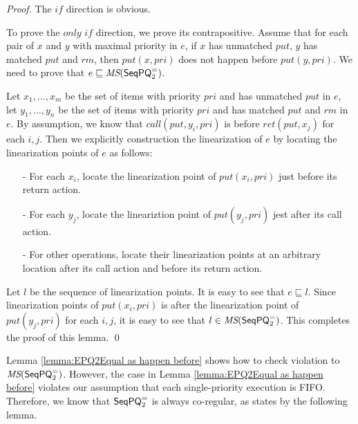 \begin {proof}

The $\textit{if}$ direction is obvious.

To prove the $\textit{only if}$ direction, we prove its contrapositive. Assume that for each pair of $x$ and $y$ with maximal priority in $e$, if $x$ has unmatched $\textit{put}$, $y$ has matched $\textit{put}$ and $\textit{rm}$, then $\textit{put}(x,\textit{pri})$ does not happen before $\textit{put}(y,\textit{pri})$. We need to prove that $e \sqsubseteq \textit{MS}(\mathsf{SeqPQ}_2^{=})$.

Let $x_1,\ldots,x_m$ be the set of items with priority $\textit{pri}$ and has unmatched $\textit{put}$ in $e$, let $y_1,\ldots,y_n$ be the set of items with priority $\textit{pri}$ and has matched $\textit{put}$ and $\textit{rm}$ in $e$. By assumption, we know that $\textit{call}(\textit{put},y_i,\textit{pri})$ is before $\textit{ret}(\textit{put},x_j)$ for each $i,j$. Then we explicitly construction the linearization of $e$ by locating the linearization points of $e$ as follows:

\begin{itemize}
\setlength{\itemsep}{0.5pt}
\item[-] For each $x_i$, locate the linearization point of $\textit{put}(x_i,\textit{pri})$ just before its return action.

\item[-] For each $y_j$, locate the lineariztion point of $\textit{put}(y_j,\textit{pri})$ jest after its call action.

\item[-] For other operations, locate their linearization points at an arbitrary location after its call action and before its return action.
\end{itemize}

Let $l$ be the sequence of linearization points. It is easy to see that $e \sqsubseteq l$. Since linearization points of $\textit{put}(x_i,\textit{pri})$ is after the linearization point of $\textit{put}(y_j,\textit{pri})$ for each $i,j$, it is easy to see that $l \in \textit{MS}(\mathsf{SeqPQ}_2^{=})$. This completes the proof of this lemma. \qed
\end {proof}

Lemma \ref{lemma:EPQ2Equal as happen before} shows how to check violation to $\textit{MS}(\mathsf{SeqPQ}_2^{=})$. However, the case in Lemma \ref{lemma:EPQ2Equal as happen before} violates our assumption that each single-priority execution is FIFO. Therefore, we know that $\mathsf{SeqPQ}_2^{=}$ is always co-regular, as states by the following lemma.


